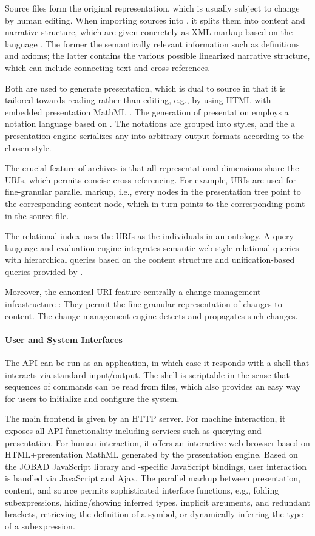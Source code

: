 Source files form the original representation, which is usually subject to change by human editing.
When importing sources into {\mmt}, it splits them into content and narrative structure, which are given concretely as XML markup based on the {\omdoc} language \cite{omdoc}.
The former the semantically relevant information such as definitions and axioms; the latter contains the various possible linearized narrative structure, which can include connecting text and cross-references.

Both are used to generate presentation, which is dual to source in that it is tailored towards reading rather than editing, e.g., by using HTML with embedded presentation MathML \cite{mathml}.
The generation of presentation employs a notation language based on .
The notations are grouped into styles, and the {\mmt} a presentation engine serializes any {\mmt} into arbitrary output formats according to the chosen style.

The crucial feature of {\mmt} archives is that all representational dimensions share the {\mmt} URIs, which permits concise cross-referencing.
For example, {\mmt} URIs are used for fine-granular parallel markup, i.e., every nodes in the presentation tree point to the corresponding content node, which in turn points to the corresponding point in the source file.

The relational index uses the {\mmt} URIs as the individuals in an {\mmt} ontology.
A query language and evaluation engine  integrates semantic web-style relational queries with hierarchical queries based on the content structure and unification-based queries provided by \cite{mathwebsearch,IK:flatsearch:12}.

Moreover, the canonical URI feature centrally a change management infrastructure : They permit the fine-granular representation of changes to {\mmt} content.
The {\mmt} change management engine detects and propagates such changes.

\paragraph{User and System Interfaces}
The API can be run as an application, in which case it responds with a shell that interacts via standard input/output.
The shell is scriptable in the sense that sequences of commands can be read from files, which also provides an easy way for users to initialize and configure the system.

The main frontend is given by an HTTP server.
For machine interaction, it exposes all API functionality including services such as querying and presentation.
For human interaction, it offers an interactive web browser based on HTML+presentation MathML generated by the presentation engine.
Based on the JOBAD JavaScript library  and {\mmt}-specific JavaScript bindings, user interaction is handled via JavaScript and Ajax.
The parallel markup between presentation, content, and source permits sophisticated interface functions, e.g., folding subexpressions, hiding/showing inferred types, implicit arguments, and redundant brackets, retrieving the definition of a symbol, or dynamically inferring the type of a subexpression.
\medskip

